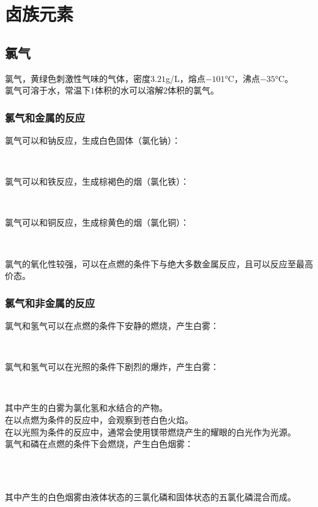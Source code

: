 \documentclass[UTF8]{ctexart}
\begin{document}
\newpage

\section{卤族元素}

\subsection{氯气}
    氯气，黄绿色刺激性气味的气体，密度$3.21$\si{g/L}，熔点$-101$\si{\degreeCelsius}，沸点$-35$\si{\degreeCelsius}。\\[3mm]
    氯气可溶于水，常温下$1$体积的水可以溶解$2$体积的氯气。

\subsubsection{氯气和金属的反应}
    氯气可以和钠反应，生成白色固体（氯化钠）：
    \begin{center}
        \\[6mm]
    \end{center}
    氯气可以和铁反应，生成棕褐色的烟（氯化铁）：
    \begin{center}
        \\[6mm]
    \end{center}
    氯气可以和铜反应，生成棕黄色的烟（氯化铜）：
    \begin{center}
        \\[6mm]
    \end{center}
    氯气的氧化性较强，可以在点燃的条件下与绝大多数金属反应，且可以反应至最高价态。

\subsubsection{氯气和非金属的反应}
    氯气和氢气可以在点燃的条件下安静的燃烧，产生白雾：
    \begin{center}
        \\[6mm]
    \end{center}
    氯气和氢气可以在光照的条件下剧烈的爆炸，产生白雾：
    \begin{center}
        \\[6mm]
    \end{center}
    其中产生的白雾为氯化氢和水结合的产物。\\[3mm]
    在以点燃为条件的反应中，会观察到苍白色火焰。\\[3mm]
    在以光照为条件的反应中，通常会使用镁带燃烧产生的耀眼的白光作为光源。\\[8mm]
    氯气和磷在点燃的条件下会燃烧，产生白色烟雾：
    \begin{center}
        \\[3mm]
        \\[6mm]
    \end{center}
    其中产生的白色烟雾由液体状态的三氯化磷和固体状态的五氯化磷混合而成。
\end{document}

